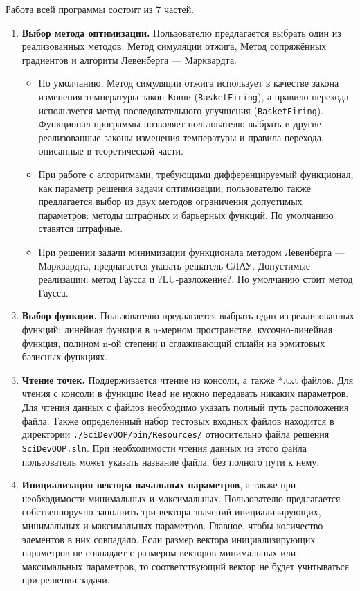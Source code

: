 Работа всей программы состоит из 7 частей.

\begin{enumerate}
	\item \textbf{Выбор метода оптимизации.} Пользователю предлагается выбрать один из реализованных методов: Метод симуляции отжига, Метод сопряжённых градиентов и алгоритм Левенберга — Марквардта.
	\begin{itemize}
		\item По умолчанию, Метод симуляции отжига использует в качестве закона изменения температуры закон Коши (\texttt{BasketFiring}), а правило перехода используется метод последовательного улучшения (\texttt{BasketFiring}). Функционал программы позволяет пользователю выбрать и другие реализованные законы изменения температуры и правила перехода, описанные в теоретической части.
		\item При работе с алгоритмами, требующими дифференцируемый функционал, как параметр решения задачи оптимизации, пользователю также предлагается выбор из двух методов ограничения допустимых параметров: методы штрафных и барьерных функций. По умолчанию ставятся штрафные.
		\item При решении задачи минимизации функционала методом Левенберга — Марквардта, предлагается указать решатель СЛАУ. Допустимые реализации: метод Гаусса и ?LU-разложение?. По умолчанию стоит метод Гаусса.
	\end{itemize}
	\item \textbf{Выбор функции.} Пользователю предлагается выбрать один из реализованных функций: линейная функция в n-мерном пространстве, кусочно-линейная функция, полином n-ой степени и сглаживающий сплайн на эрмитовых базисных функциях.
	\item \textbf{Чтение точек.} Поддерживается чтение из консоли, а также *.txt файлов. Для чтения с консоли в функцию \texttt{Read} не нужно передавать никаких параметров. Для чтения данных с файлов необходимо указать полный путь расположения файла. Также определённый набор тестовых входных файлов находится в директории \texttt{./SciDevOOP/bin/Resources/} относительно файла решения \texttt{SciDevOOP.sln}. При необходимости чтения данных из этого файла пользователь может указать название файла, без полного пути к нему.
	\item \textbf{Инициализация вектора начальных параметров}, а также при необходимости минимальных и максимальных. Пользователю предлагается собственноручно заполнить три вектора значений инициализирующих, минимальных и максимальных параметров. Главное, чтобы количество элементов в них совпадало. Если размер вектора инициализирующих параметров не совпадает с размером векторов минимальных или максимальных параметров, то соответствующий вектор не будет учитываться при решении задачи. 

\end{enumerate}
